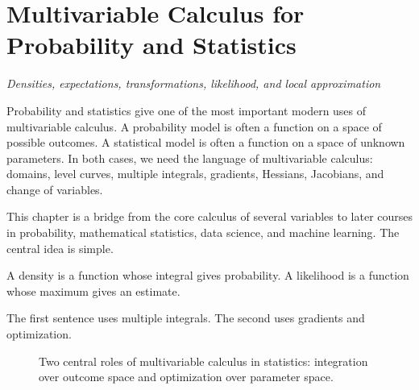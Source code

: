 \documentclass[11pt,oneside]{book}
\begin{document}
\setcounter{chapter}{23}
\chapter{Multivariable Calculus for Probability and Statistics}
\textit{Densities, expectations, transformations, likelihood, and local approximation}

Probability and statistics give one of the most important modern uses of multivariable calculus. A probability model is often a function on a space of possible outcomes. A statistical model is often a function on a space of unknown parameters. In both cases, we need the language of multivariable calculus: domains, level curves, multiple integrals, gradients, Hessians, Jacobians, and change of variables.

This chapter is a bridge from the core calculus of several variables to later courses in probability, mathematical statistics, data science, and machine learning. The central idea is simple.

\begin{mainideabox}
A density is a function whose integral gives probability. A likelihood is a function whose maximum gives an estimate.
\end{mainideabox}

The first sentence uses multiple integrals. The second uses gradients and optimization.

\begin{figure}[H]
\centering
{}
\caption{Two central roles of multivariable calculus in statistics: integration over outcome space and optimization over parameter space.}
\end{figure}
\end{document}
